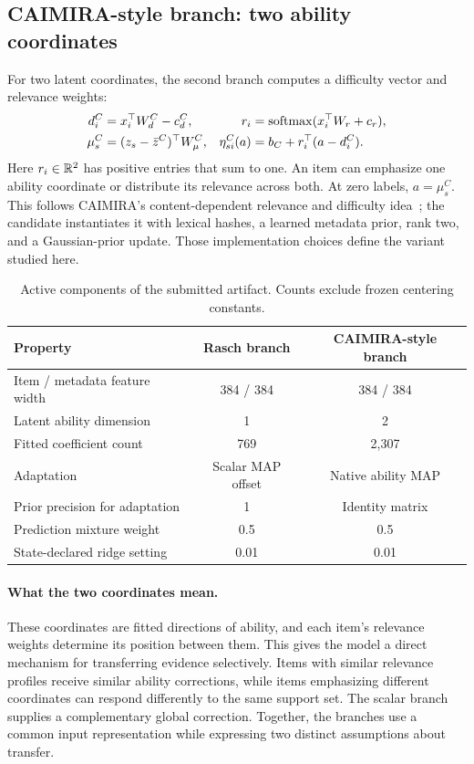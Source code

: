 \subsection{CAIMIRA-style branch: two ability coordinates}
For two latent coordinates, the second branch computes a difficulty vector and relevance weights:
\begin{align}
 d_i^{C}&=x_i^\top W_d^{C}-c_d^{C}, &
 r_i&=\operatorname{softmax}(x_i^\top W_r+c_r), \\
 \mu_s^{C}&=(z_s-\bar z^{C})^\top W_\mu^{C}, &
 \eta_{si}^{C}(a)&=b_C+r_i^\top(a-d_i^{C}).
 \label{eq:caimira}
\end{align}
Here $r_i\in\mathbb{R}^2$ has positive entries that sum to one. An item can emphasize one ability coordinate or distribute its relevance across both. At zero labels, $a=\mu_s^{C}$. This follows CAIMIRA's content-dependent relevance and difficulty idea~\citep{gor2024}; the candidate instantiates it with lexical hashes, a learned metadata prior, rank two, and a Gaussian-prior update. Those implementation choices define the variant studied here.

\begin{table}[H]
\centering
\caption{Active components of the submitted artifact. Counts exclude frozen centering constants.}
\label{tab:implementation}
\small
\begin{tabular}{@{}lcc@{}}
\toprule
Property & Rasch branch & CAIMIRA-style branch \\
\midrule
Item / metadata feature width & 384 / 384 & 384 / 384 \\
Latent ability dimension & 1 & 2 \\
Fitted coefficient count & 769 & 2,307 \\
Adaptation & Scalar MAP offset & Native ability MAP \\
Prior precision for adaptation & 1 & Identity matrix \\
Prediction mixture weight & 0.5 & 0.5 \\
State-declared ridge setting & 0.01 & 0.01 \\
\bottomrule
\end{tabular}
\end{table}

\paragraph{What the two coordinates mean.}
These coordinates are fitted directions of ability, and each item's relevance weights determine its position between them. This gives the model a direct mechanism for transferring evidence selectively. Items with similar relevance profiles receive similar ability corrections, while items emphasizing different coordinates can respond differently to the same support set. The scalar branch supplies a complementary global correction. Together, the branches use a common input representation while expressing two distinct assumptions about transfer.
